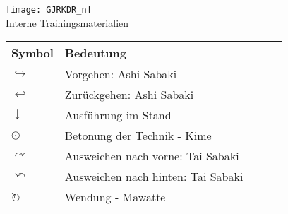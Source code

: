 \setcounter{num}{0}
\setcounter{numz}{0}
\begin{tcolorbox}[width=\textwidth,height=\textheight,right=12pt,left=12pt,colframe=SGL2,colback=white,fonttitle=\bfseries,coltitle=black,title=Trainingskartensatz G\={o}j\={u}-Ry\={u} Karate-D\={o} Langenfeld-Reusrath]
	\null\vfill\null	
	\begin{center}
		\texttt{[image: GJRKDR\_n]}\\
		Interne Trainingsmaterialien
	\end{center}
\end{tcolorbox}
\clearpage
\pagebreak
\setcounter{num}{0}
\setcounter{numz}{0}	
\begin{tcolorbox}[width=\textwidth,height=\textheight,right=12pt,left=12pt,colframe=SGL2,colback=white,fonttitle=\bfseries,coltitle=black,title=Allgemeines:\indent Erläuterungen]
	\null\vfill\null
	\begin{tabularx}{\textwidth}{lllll}
		Symbol	& Bedeutung	& &&\\
		\midrule
		\(\hookrightarrow\) 	& Vorgehen: Ashi Sabaki					& & &\\
		\(\hookleftarrow\) 		& Zurückgehen: Ashi Sabaki				& & &\\
		\(\downarrow\) 			& Ausführung im Stand					& & &\\
		\(\odot\) 				& Betonung der Technik - Kime			& & &\\
		\(\curvearrowright\)	& Ausweichen nach vorne: Tai Sabaki		& & &\\
		\(\curvearrowleft\)		& Ausweichen nach hinten: Tai Sabaki	& & &\\
		\(\circlearrowright\)	& Wendung - Mawatte						& & &\\
	\end{tabularx}\null\vfill\null
\end{tcolorbox}
\clearpage
\pagebreak
